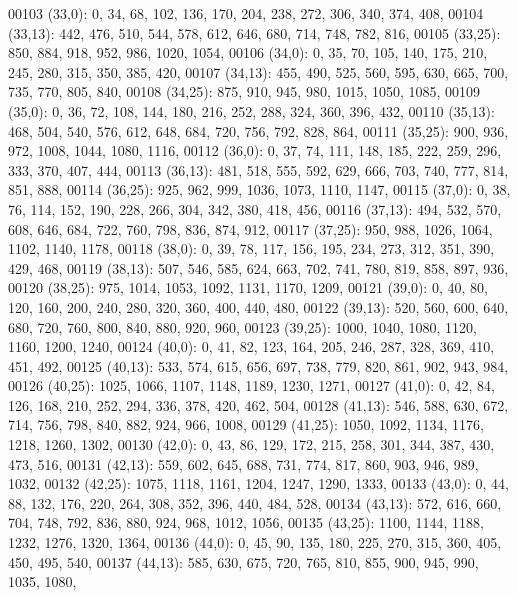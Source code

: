 \begin{DoxyCode}
00103       (33,0): 0, 34, 68, 102, 136, 170, 204, 238, 272, 306, 340, 374, 408,
00104       (33,13): 442, 476, 510, 544, 578, 612, 646, 680, 714, 748, 782, 816,
00105       (33,25): 850, 884, 918, 952, 986, 1020, 1054,
00106       (34,0): 0, 35, 70, 105, 140, 175, 210, 245, 280, 315, 350, 385, 420,
00107       (34,13): 455, 490, 525, 560, 595, 630, 665, 700, 735, 770, 805, 840,
00108       (34,25): 875, 910, 945, 980, 1015, 1050, 1085,
00109       (35,0): 0, 36, 72, 108, 144, 180, 216, 252, 288, 324, 360, 396, 432,
00110       (35,13): 468, 504, 540, 576, 612, 648, 684, 720, 756, 792, 828, 864,
00111       (35,25): 900, 936, 972, 1008, 1044, 1080, 1116,
00112       (36,0): 0, 37, 74, 111, 148, 185, 222, 259, 296, 333, 370, 407, 444,
00113       (36,13): 481, 518, 555, 592, 629, 666, 703, 740, 777, 814, 851, 888,
00114       (36,25): 925, 962, 999, 1036, 1073, 1110, 1147,
00115       (37,0): 0, 38, 76, 114, 152, 190, 228, 266, 304, 342, 380, 418, 456,
00116       (37,13): 494, 532, 570, 608, 646, 684, 722, 760, 798, 836, 874, 912,
00117       (37,25): 950, 988, 1026, 1064, 1102, 1140, 1178,
00118       (38,0): 0, 39, 78, 117, 156, 195, 234, 273, 312, 351, 390, 429, 468,
00119       (38,13): 507, 546, 585, 624, 663, 702, 741, 780, 819, 858, 897, 936,
00120       (38,25): 975, 1014, 1053, 1092, 1131, 1170, 1209,
00121       (39,0): 0, 40, 80, 120, 160, 200, 240, 280, 320, 360, 400, 440, 480,
00122       (39,13): 520, 560, 600, 640, 680, 720, 760, 800, 840, 880, 920, 960,
00123       (39,25): 1000, 1040, 1080, 1120, 1160, 1200, 1240,
00124       (40,0): 0, 41, 82, 123, 164, 205, 246, 287, 328, 369, 410, 451, 492,
00125       (40,13): 533, 574, 615, 656, 697, 738, 779, 820, 861, 902, 943, 984,
00126       (40,25): 1025, 1066, 1107, 1148, 1189, 1230, 1271,
00127       (41,0): 0, 42, 84, 126, 168, 210, 252, 294, 336, 378, 420, 462, 504,
00128       (41,13): 546, 588, 630, 672, 714, 756, 798, 840, 882, 924, 966, 1008,
00129       (41,25): 1050, 1092, 1134, 1176, 1218, 1260, 1302,
00130       (42,0): 0, 43, 86, 129, 172, 215, 258, 301, 344, 387, 430, 473, 516,
00131       (42,13): 559, 602, 645, 688, 731, 774, 817, 860, 903, 946, 989, 1032,
00132       (42,25): 1075, 1118, 1161, 1204, 1247, 1290, 1333,
00133       (43,0): 0, 44, 88, 132, 176, 220, 264, 308, 352, 396, 440, 484, 528,
00134       (43,13): 572, 616, 660, 704, 748, 792, 836, 880, 924, 968, 1012, 1056,
00135       (43,25): 1100, 1144, 1188, 1232, 1276, 1320, 1364,
00136       (44,0): 0, 45, 90, 135, 180, 225, 270, 315, 360, 405, 450, 495, 540,
00137       (44,13): 585, 630, 675, 720, 765, 810, 855, 900, 945, 990, 1035, 1080,

\end{DoxyCode}
